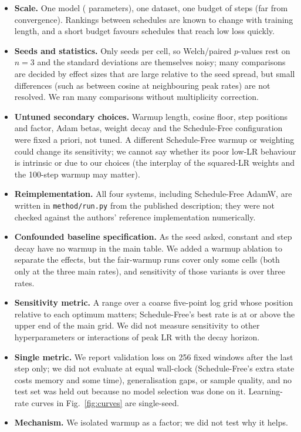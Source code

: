 \label{sec:limits}
\begin{itemize}
\item \textbf{Scale.} One model ( parameters), one dataset, one budget of  steps (far from convergence). Rankings between schedules are known to change with training length, and a short budget favours schedules that reach low loss quickly.
\item \textbf{Seeds and statistics.} Only  seeds per cell, so Welch/paired $p$-values rest on $n=3$ and the standard deviations are themselves noisy; many comparisons are decided by effect sizes that are large relative to the seed spread, but small differences (such as between cosine at neighbouring peak rates) are not resolved. We ran many comparisons without multiplicity correction.
\item \textbf{Untuned secondary choices.} Warmup length, cosine floor, step positions and factor, Adam betas, weight decay and the Schedule-Free configuration were fixed a priori, not tuned. A different Schedule-Free warmup or weighting could change its sensitivity; we cannot say whether its poor low-LR behaviour is intrinsic or due to our choices (the interplay of the squared-LR weights and the 100-step warmup may matter).
\item \textbf{Reimplementation.} All four systems, including Schedule-Free AdamW, are written in \texttt{method/run.py} from the published description; they were not checked against the authors' reference implementation numerically.
\item \textbf{Confounded baseline specification.} As the seed asked, constant and step decay have no warmup in the main table. We added a warmup ablation to separate the effects, but the fair-warmup runs cover only some cells (both only at the three main rates), and sensitivity of those variants is over three rates.
\item \textbf{Sensitivity metric.} A range over a coarse five-point log grid whose position relative to each optimum matters; Schedule-Free's best rate is at or above the upper end of the main grid. We did not measure sensitivity to other hyperparameters or interactions of peak LR with the decay horizon.
\item \textbf{Single metric.} We report validation loss on 256 fixed windows after the last step only; we did not evaluate at equal wall-clock (Schedule-Free's extra state costs memory and some time), generalisation gaps, or sample quality, and no test set was held out because no model selection was done on it. Learning-rate curves in Fig.~\ref{fig:curves} are single-seed.
\item \textbf{Mechanism.} We isolated warmup as a factor; we did not test why it helps.
\end{itemize}
